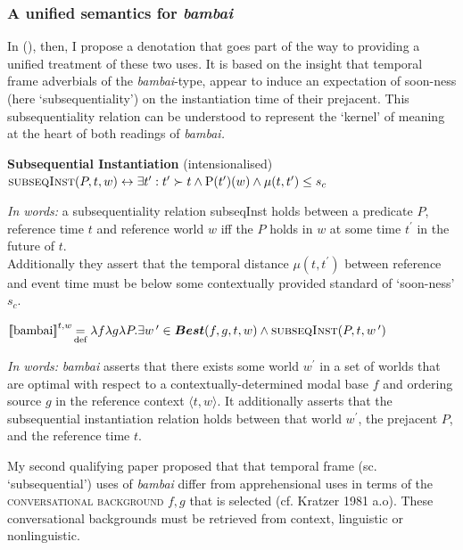 \documentclass[12pt]{article}
\newcommand{\denote}[1]{\mbox{$[\![\mbox{#1}]\!]$}}
\newcommand{\la}{\langle}
\newcommand{\ra}{\rangle}
\begin{document}
\subsubsection{A unified semantics for \textit{bambai}}

In (\nextx), then, I propose a denotation that goes part of the way to providing a unified treatment of these two uses. It is based on the insight that temporal frame adverbials of the \textit{bambai}-type, appear to induce an expectation of soon-ness (here `subsequentiality') on the instantiation time of their prejacent. This subsequentiality relation can be understood to represent the `kernel' of meaning at the heart of both readings of \textit{bambai.}



\pex\a{}\textbf{Subsequential Instantiation} (intensionalised)\\$\text{{\sc subseqInst}}(P,t,w)\leftrightarrow\exists t^\prime:t^\prime\succ{}t\wedge\text P(t^\prime)(w)\wedge\mu(t,t^\prime)\leq s_c$


\textsl{In words:} a subsequentiality relation {\sc subseqInst} holds between a predicate $P$, reference time $t$ and reference world $w$ iff the $P$ holds in $w$ at some time $t^\prime$ in the future of $t$.\\Additionally they assert that the temporal distance $\mu(t,t^\prime)$ between reference and event time must be below some contextually provided standard of `soon-ness' $s_c$. %


\a $\denote{bambai}^{t,w}\!\underset{\text{def}}{=}\lambda f\lambda g\lambda P.\exists w\,^\prime\in\boldsymbol{Best}(f,g,t,w)\wedge\text{{\sc subseqInst}}(P,t,w\,^\prime)$

\textsl{In words:} \textit{bambai} asserts that there exists some world $w^\prime$ in a set of worlds that are optimal with respect to a contextually-determined modal base $f$ and ordering source $g$ in the reference context $\la t,w\ra$. It additionally asserts that the {\sc subsequential instantiation} relation holds between that world $w^\prime$, the prejacent $P$, and the reference time $t$.
\xe


My second qualifying paper proposed that that temporal frame (sc. `subsequential') uses of \textit{bambai} differ from apprehensional uses in terms of the \textsc{conversational background} $f,g$ that is selected (cf. Kratzer 1981 a.o). These conversational backgrounds must be retrieved from context, linguistic or nonlinguistic.
\end{document}
